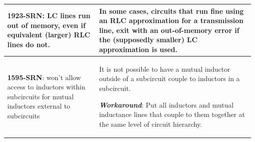 {\begin{longtable}[h] {>{\raggedright\small}m{2in}|>{\raggedright\let\\\tabularnewline\small}m{3.5in}}
\textbf{1923-SRN}: LC lines run out of memory, even if equivalent (larger) RLC
lines do not. & In some cases, circuits that run fine using an RLC
approximation for a transmission line, exit with an out-of-memory
error if the (supposedly smaller) LC approximation is used.
\\ \hline

\textbf{1595-SRN}: \Xyce{} won't allow access to inductors within subcircuits
for mutual inductors external to subcircuits & It is not possible to
have a mutual inductor outside of a subcircuit couple to inductors in
a subcircuit.

\textbf{\textit{Workaround}}: Put all inductors and mutual inductance lines
that couple to them together at the same level of circuit hierarchy.
\\ \hline

\end{longtable}
}
